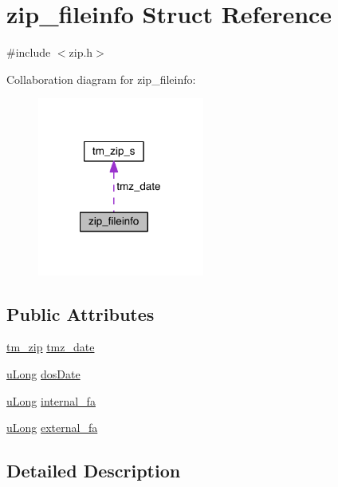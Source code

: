 \hypertarget{structzip__fileinfo}{\section{zip\+\_\+fileinfo Struct Reference}
\label{structzip__fileinfo}
}


{\ttfamily \#include $<$zip.\+h$>$}



Collaboration diagram for zip\+\_\+fileinfo\+:\nopagebreak
\begin{figure}[H]
\begin{center}
\leavevmode
\includegraphics[width=155pt]{d1/d92/structzip__fileinfo__coll__graph}
\end{center}
\end{figure}
\subsection*{Public Attributes}
\begin{DoxyCompactItemize}
\item 
\hyperlink{zip_8h_a93b9012a85479327c6da966108d8f743}{tm\+\_\+zip} \hyperlink{structzip__fileinfo_ae09a694a598b7507d23705764c9e46fb}{tmz\+\_\+date}
\item 
\hyperlink{ioapi_8h_a50e9e9d5c30e481de822ad68fe537986}{u\+Long} \hyperlink{structzip__fileinfo_a0541c57e59450fbc17b2f898ca4bc9e8}{dos\+Date}
\item 
\hyperlink{ioapi_8h_a50e9e9d5c30e481de822ad68fe537986}{u\+Long} \hyperlink{structzip__fileinfo_a396175a434b86115ce5600ab1dbb1644}{internal\+\_\+fa}
\item 
\hyperlink{ioapi_8h_a50e9e9d5c30e481de822ad68fe537986}{u\+Long} \hyperlink{structzip__fileinfo_ac0be78ded330ffd46815bafc5b6b37bb}{external\+\_\+fa}
\end{DoxyCompactItemize}


\subsection{Detailed Description}


